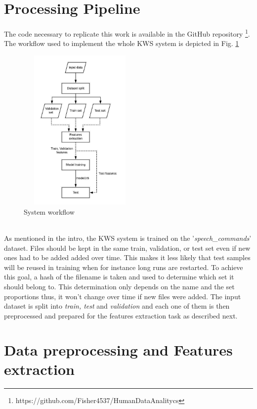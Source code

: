\section{Processing Pipeline}
\label{sec:processing_pipeine}

\noindent The code necessary to replicate this work is available in the GitHub repository \footnote{https://github.com/Fisher4537/HumanDataAnalitycs}.\\
The workflow used to implement the whole KWS system is depicted in Fig. \ref{fig:pipeline} \\
\begin{figure}[h]
			\centering
	    	\includegraphics[width=6cm, height=8cm ,width=0.25\textwidth]{pipeline}
	    	\caption{System workflow}
	    	\label{fig:pipeline}
\end{figure} \\
\noindent As mentioned in the intro, the KWS system is trained on the '{\it{speech\_commands}}' dataset.  Files should be kept in the same train, validation, or test set even if new ones had to be added added over time. This makes it less likely that test samples will be reused in training when for instance long runs are restarted. To achieve this goal, a hash of the filename is taken and used to determine which set it should belong to. This determination only depends on the name and the set proportions thus, it won't change over time if new files were added. The input dataset is split into {\it{train, test}} and {\it{validation}} and each one of them is then preprocessed and prepared for the features extraction task as described next.



\section{Data preprocessing and Features extraction}
\label{sec:model}

